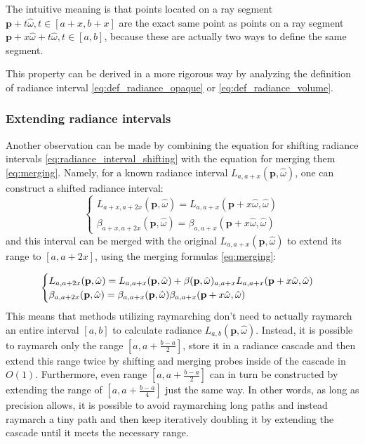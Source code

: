 \documentclass{jcgt}
\begin{document}
The intuitive meaning is that points located on a ray segment $\textbf{p} + t \hat \omega, t \in [a+x,b+x]$ are the exact same point as points on a ray segment $\textbf{p} + x \hat \omega + t \hat \omega, t \in [a,b]$, because these are actually two ways to define the same segment.

This property can be derived in a more rigorous way by analyzing the definition of radiance interval \ref{eq:def_radiance_opaque} or  \ref{eq:def_radiance_volume}.


\subsubsection{Extending radiance intervals}
Another observation can be made by combining the equation for shifting radiance intervals \ref{eq:radiance_interval_shifting} with the equation for merging them \ref{eq:merging}. Namely, for a known radiance interval $L_{a,a+x}(\textbf{p}, \hat \omega)$, one can construct a shifted radiance interval: 
\begin{equation}
  \begin{cases}
    L_{a+x,a+2x}(\textbf{p}, \hat \omega)
      =L_{a,a+x}(\textbf{p}+x\hat \omega, \hat \omega) \\
    \beta_{a+x,a+2x}(\textbf{p}, \hat \omega)
      =\beta_{a,a+x}(\textbf{p}+x\hat \omega, \hat \omega)
  \end{cases}
\end{equation}
and this interval can be merged with the original $L_{a,a+x}(\textbf{p}, \hat \omega)$ to extend its range to $[a,a+2x]$, using the merging formulas \ref{eq:merging}:

\begin{equation}
  \begin{cases}
    L_{a,a+2x}(\textbf{p}, \hat \omega) = L_{a,a+x}(\textbf{p}, \hat \omega) + \beta(\textbf p, \hat \omega)_{a, a+x}L_{a,a+x}(\textbf{p} + x\hat \omega, \hat \omega)\\
    \beta_{a, a+2x}(\textbf p, \hat \omega) = \beta_{a, a+x}(\textbf p, \hat \omega)\beta_{a, a+x}(\textbf p+x\hat \omega, \hat \omega)
    \label{eq:extending_intervals}
  \end{cases}
\end{equation}
This means that methods utilizing raymarching don't need to actually raymarch an entire interval $[a, b]$ to calculate radiance $L_{a,b}(\textbf{p}, \hat \omega)$. Instead, it is possible to raymarch only the range $[a, a + \frac{b-a}{2}]$, store it in a radiance cascade and then extend this range twice by shifting and merging probes inside of the cascade in $O(1)$. Furthermore, even range $[a, a+\frac{b-a}{2}]$ can in turn be constructed by extending the range of $[a, a+\frac{b-a}{4}]$ just the same way. In other words, as long as precision allows, it is possible to avoid raymarching long paths and instead raymarch a tiny path and then keep iteratively doubling it by extending the cascade until it meets the necessary range.
\end{document}
